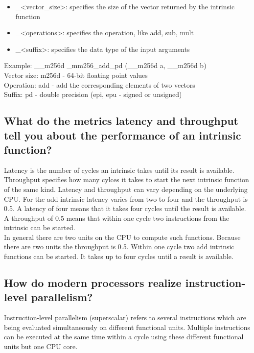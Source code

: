 \documentclass[runningheads]{llncs}
\begin{document}
\begin{itemize}
	\item \_<vector\_size>: specifies the size of the vector returned by the intrinsic function
	\item \_<operations>: specifies the operation, like add, sub, mult
	\item \_<suffix>: specifies the data type of the input arguments
\end{itemize}
Example: \_\_m256d \_mm256\_add\_pd (\_\_m256d a, \_\_m256d b) \\
Vector size: m256d - 64-bit floating point values \\
Operation: add - add the corresponding elements of two vectors \\
Suffix: pd - double precision (epi, epu - signed or unsigned)

\subsection{What do the metrics latency and throughput tell you about the performance of an intrinsic function?}
Latency is the number of cycles an intrinsic takes until its result is available. 
Throughput specifies how many cylces it takes to start the next intrinsic function of the same kind.
Latency and throughput can vary depending on the underlying CPU. For the add intrinsic latency varies from two to four
and the throughput is 0.5. A latency of four means that it takes four cycles until the result is available. A throughput of 0.5
means that within one cycle two instructions from the intrinsic can be started. 
\\
In general there are two units on the CPU to
compute such functions. Because there are two units the throughput is 0.5.
Within one cycle two add intrinsic functions can be started. It takes up to four cycles until a result is available.

\subsection{How do modern processors realize instruction-level parallelism?}
Instruction-level parallelism (superscalar) refers to several instructions which are being evaluated simultaneously on
different functional units.
Multiple instructions can be executed at the same time within a cycle using these different functional units but one CPU core.
\end{document}
